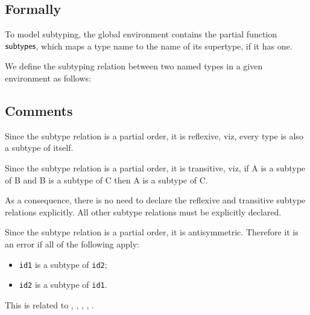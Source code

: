 \documentclass{book}
\newcommand\tenv[0]{\texttt{env}}
\newcommand\vtone[0]{\texttt{t1}}
\newcommand\vttwo[0]{\texttt{t2}}
\newcommand\tty[0]{\texttt{ty}}
\begin{document}
\begin{emptyformal}
    \subsection{Formally}
\end{emptyformal}

To model subtyping, the global environment contains the partial function \\
$\textsf{subtypes}$, which maps a type name to the name of its supertype, if it has
one.

We define the subtyping relation between two named types in a given environment as follows:
	  
  \subsection{Comments}
  Since the subtype relation is a partial order, it is reflexive, viz, 
  every type is also a subtype of itself. 

  Since the subtype relation is a partial order, it is transitive, viz, if A is
  a subtype of B and B is a subtype of C then A is a subtype of C.

  As a consequence, there is no need to declare the reflexive and transitive
  subtype relations explicitly. All other subtype relations must be explicitly
  declared.

  Since the subtype relation is a partial order, it is antisymmetric. Therefore
  it is an error if all of the following apply:
  \begin{itemize}
  \item \texttt{id1} is a subtype of \texttt{id2};
  \item \texttt{id2} is a subtype of \texttt{id1}.
  \end{itemize}

  This is related to , , , , .
\end{document}

